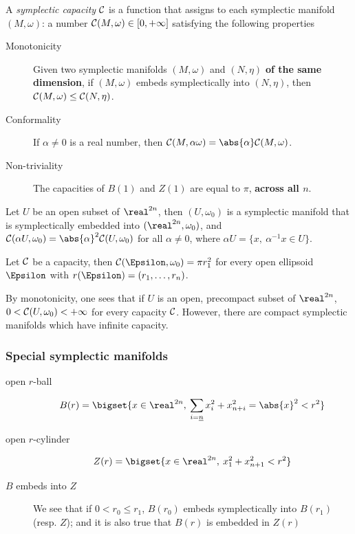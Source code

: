 \documentclass[../main-v2-manifolds.tex]{subfiles}
\begin{document}
\begin{definition}
    A \emph{symplectic capacity} $\mathcal{C}$ is a function that assigns to each symplectic manifold $(M,\omega)$:  a number $\mathcal{C}(M,\omega)\in[0,+\infty]$ satisfying the following properties
    \begin{description}
        \item[Monotonicity] Given two symplectic manifolds $(M,\omega)$ and $(N,\eta)$ \textbf{of the same dimension}, if $(M,\omega)$ embeds symplectically into $(N,\eta)$, then $\mathcal{C}(M,\omega) \leq \mathcal{C}(N,\eta)$.
        \item[Conformality] If $\alpha\neq 0$ is a real number, then $\frakc(M,\alpha\omega) = \abs{\alpha}\frakc(M,\omega)$.
        \item[Non-triviality] The capacities of $B(1)$ and $Z(1)$ are equal to $\pi$, \textbf{across all $n$}.
    \end{description}
\end{definition}
\begin{wts}
    Let $U$ be an open subset of $\realtn$, then $(U,\omega_0)$ is a symplectic manifold that is symplectically embedded into $(\realtn,\omega_0)$, and $\frakc(\alpha U,\omega_0) = \abs{\alpha}^2\frakc(U,\omega_0)$ for all $\alpha\neq 0$, where $\alpha U = \{x,\: \alpha^{-1} x\in U\}$.
\end{wts}
\begin{wts}
    Let $\mathcal{C}$ be a capacity, then $\frakc(\Epsilon,\omega_0) = \pi r_1^2$ for every open ellipsoid $\Epsilon$ with $r(\Epsilon) = (r_1,\ldots, r_n)$.
\end{wts}
\begin{remark}
    By monotonicity, one sees that if $U$ is an open, precompact subset of $\realtn$, $0<\mathcal{C}(U,\omega_0)<+\infty$ for every capacity $\mathcal{C}$. However, there are compact symplectic manifolds which have infinite capacity.
\end{remark}
\subsubsection*{Special symplectic manifolds}
\begin{description}
    \item[open $r$-ball]
    \[
    B(r) = \bigset{x\in\realtn,\: \sum_{i=\underline{n}} x^2_{i} + x^2_{n+i}=\abs{x}^2<r^2}
    \]
    \item[open $r$-cylinder]
    \[
    Z(r) = \bigset{x\in\realtn,\: x^2_1 + x^2_{n+1}<r^2}
    \]
    \item[$B$ embeds into $Z$] We see that if $0<r_0\leq r_1$, $B(r_0)$ embeds symplectically into $B(r_1)$ (resp. $Z$); and it is also true that $B(r)$ is embedded in $Z(r)$
\end{description}
\end{document}
